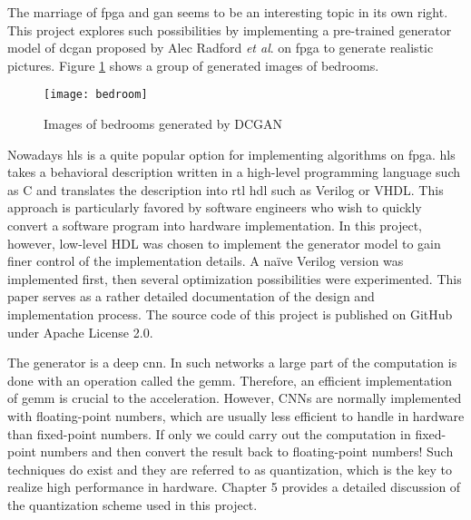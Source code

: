 The marriage of \gls{fpga} and \gls{gan} seems to be an interesting topic in its own right. This project
explores such possibilities by implementing a pre-trained generator model of \gls{dcgan} proposed by
Alec Radford \textit{et al}. \cite{radford:conv_gan} on \gls{fpga} to generate realistic pictures.
Figure \ref{fig:bedroom} shows a group of generated images of bedrooms.

\begin{figure}[h]
  \centering
  \texttt{[image: bedroom]}
  \caption{Images of bedrooms generated by DCGAN \cite{radford:conv_gan}}
  \label{fig:bedroom}
\end{figure}

Nowadays \gls{hls} is a quite popular option for implementing algorithms on \gls{fpga}. \gls{hls} takes a
behavioral description written in a high-level programming language such as C and translates the description
into \gls{rtl} \gls{hdl} such as Verilog or VHDL. This approach is particularly favored by software
engineers who wish to quickly convert a software program into hardware implementation. In this project,
however, low-level HDL was chosen to implement the generator model to gain finer control of the implementation
details. A naïve Verilog version was implemented first, then several optimization possibilities were
experimented. This paper serves as a rather detailed documentation of the design and implementation process.
The source code of this project is published on GitHub \cite{github:dcgan_fpga} under Apache License 2.0.

The generator is a deep \gls{cnn}. In such networks a large part of the computation is done with an
operation called the \gls{gemm}. Therefore, an efficient implementation of \gls{gemm} is crucial to the
acceleration. However, CNNs are normally implemented with floating-point numbers, which are usually less
efficient to handle in hardware than fixed-point numbers. If only we could carry out the computation in
fixed-point numbers and then convert the result back to floating-point numbers! Such techniques do exist
and they are referred to as quantization, which is the key to realize high performance in hardware. Chapter 5
provides a detailed discussion of the quantization scheme used in this project.

\clearpage %
